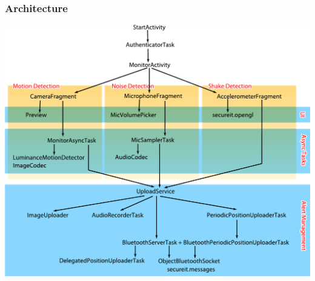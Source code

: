 \documentclass{beamer}
\begin{document}
\begin{frame}
\frametitle{Architecture}
\begin{center}
\includegraphics[scale=.4]{./../../relazioni/wireless/resources/architecture.pdf}
\end{center}
\end{frame}
\end{document}
